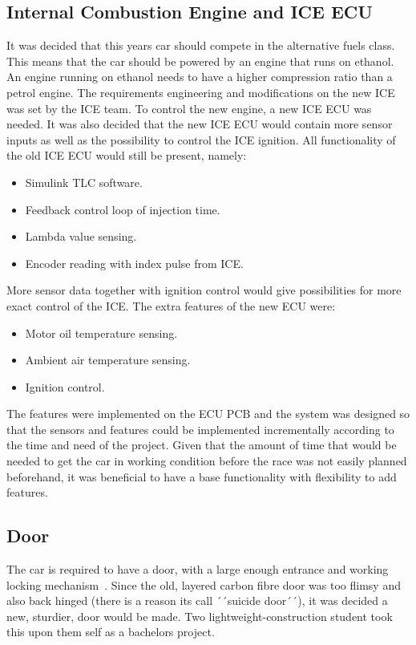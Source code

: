 \subsection{Internal Combustion Engine and ICE ECU}
It was decided that this years car should compete in the alternative fuels
class. This means that the car should be powered by an engine that runs on
ethanol. An engine running on ethanol needs to have a higher compression ratio than
a petrol engine.
The requirements engineering and modifications on the new ICE was set by the ICE
team. To control the new engine, a new ICE ECU was needed. It was also decided
that the new ICE ECU would contain more sensor inputs as well as the possibility
to control the ICE ignition. All functionality of the old ICE ECU would still be
present, namely:
\begin{itemize}
    \item Simulink TLC software.
    \item Feedback control loop of injection time.
    \item Lambda value sensing.
    \item Encoder reading with index pulse from ICE\@.
\end{itemize}
More sensor data together with ignition control would give possibilities
for more exact control of the ICE\@. The extra features of the new ECU were:
\begin{itemize}
    \item Motor oil temperature sensing.
    \item Ambient air temperature sensing.
    \item Ignition control.
\end{itemize}
The features were implemented on the ECU PCB and the system was designed so that
the sensors and features could be implemented incrementally according to the
time and need of the project. Given that the amount of time that would be needed
to get the car in working condition before the race was not easily planned
beforehand, it was beneficial to have a base functionality with flexibility to
add features.

\subsection{Door}
The car is required to have a door, with a large enough entrance and working
locking mechanism~\cite{semrules16c1}. Since the old, layered carbon fibre door
was too flimsy and also back hinged (there is a reason its call ´´suicide door´´),
it was decided a new, sturdier, door would be made. Two lightweight-construction
student took this upon them self as a bachelors project. 

